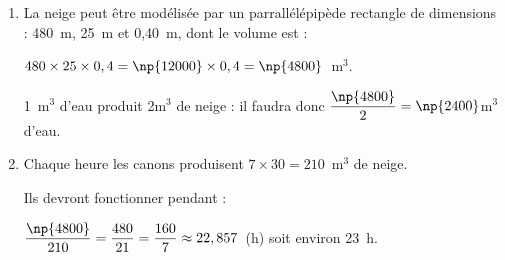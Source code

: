 
\medskip

%
%


\begin{enumerate}
\item %

La neige peut être modélisée par un parrallélépipède rectangle de dimensions : 480~m, 25~m et 0,40~m, dont le volume est :

$480 \times 25 \times 0,4 = \np{12000} \times 0,4 = \np{4800}$~m$^3$.

1~m$^3$ d'eau produit 2m$^3$ de neige : il faudra donc $\dfrac{\np{4800}}{2} = \np{2400}$m$^3$ d'eau.
\item %

Chaque heure les canons produisent $7 \times 30 = 210$~m$^3$ de neige.

Ils devront fonctionner pendant :

$\dfrac{\np{4800}}{210} = \dfrac{480}{21} = \dfrac{160}{7} \approx 22,857$~(h)   soit environ 23~h.
\end{enumerate}

\vspace{0,5cm}

